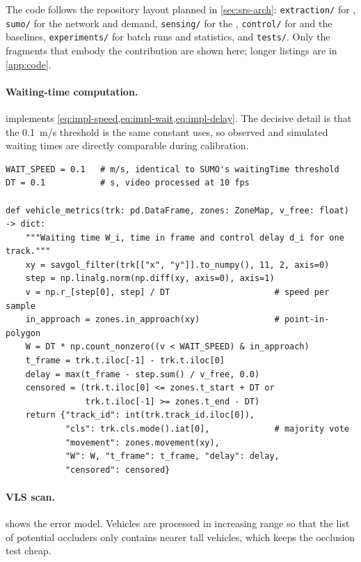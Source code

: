 The code follows the repository layout planned in \cref{sec:srs-arch}: \texttt{extraction/} for \dtx{},
\texttt{sumo/} for the network and demand, \texttt{sensing/} for the \vls{}, \texttt{control/} for
\prism{} and the baselines, \texttt{experiments/} for batch runs and statistics, and \texttt{tests/}.
Only the fragments that embody the contribution are shown here; longer listings are in
\cref{app:code}.

\paragraph{Waiting-time computation.}  implements \cref{eq:impl-speed,eq:impl-wait,eq:impl-delay}.
The decisive detail is that the 0.1~m/s threshold is the same constant \sumo{} uses, so observed and
simulated waiting times are directly comparable during calibration. 

\begin{lstlisting}[style=py,caption={Per-vehicle waiting time and control delay (\texttt{extraction/metrics.py})},label={lst:impl-wait}]
WAIT_SPEED = 0.1   # m/s, identical to SUMO's waitingTime threshold
DT = 0.1           # s, video processed at 10 fps

def vehicle_metrics(trk: pd.DataFrame, zones: ZoneMap, v_free: float) -> dict:
    """Waiting time W_i, time in frame and control delay d_i for one track."""
    xy = savgol_filter(trk[["x", "y"]].to_numpy(), 11, 2, axis=0)
    step = np.linalg.norm(np.diff(xy, axis=0), axis=1)
    v = np.r_[step[0], step] / DT                     # speed per sample
    in_approach = zones.in_approach(xy)               # point-in-polygon
    W = DT * np.count_nonzero((v < WAIT_SPEED) & in_approach)
    t_frame = trk.t.iloc[-1] - trk.t.iloc[0]
    delay = max(t_frame - step.sum() / v_free, 0.0)
    censored = (trk.t.iloc[0] <= zones.t_start + DT or
                trk.t.iloc[-1] >= zones.t_end - DT)
    return {"track_id": int(trk.track_id.iloc[0]),
            "cls": trk.cls.mode().iat[0],             # majority vote
            "movement": zones.movement(xy),
            "W": W, "t_frame": t_frame, "delay": delay,
            "censored": censored}
\end{lstlisting}

\paragraph{VLS scan.}  shows the error model. Vehicles are processed in increasing
range so that the list of potential occluders only contains nearer tall vehicles, which keeps the
occlusion test cheap.

